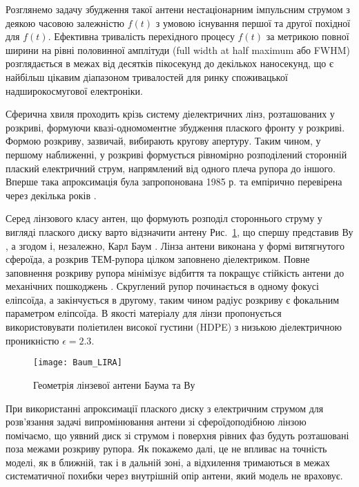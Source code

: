 Розглянемо задачу збудження такої антени нестаціонарним імпульсним струмом
з деякою часовою залежністю $ f(t) $ з умовою існування першої та другої 
похідної для $ f(t) $. Ефективна тривалість перехідного процесу $ f(t) $ за 
метрикою повної ширини на рівні половинної амплітуди (full width at half 
maximum або FWHM) розглядається в межах від десятків пікосекунд до декількох 
наносекунд, що є найбільш цікавим діапазоном тривалостей для ринку 
споживацької надширокосмугової електроніки.

Сферична хвиля проходить крізь систему діелектричних лінз, розташованих у 
розкриві, формуючи квазі-одномоментне збудження плаского фронту у розкриві. 
Формою розкриву, зазвичай, вибирають кругову апертуру. Таким чином, у першому 
наближенні, у розкриві формується рівномірно розподілений сторонній плаский 
електричний струм, напрямлений від одного плеча рупора до іншого. Вперше така
апроксимація була запропонована 1985 р. \cite{imp:Wu1985} та 
емпірично перевірена через декілька років \cite{imp:Wu1991}.

Серед лінзового класу антен, що формують розподіл стороннього струму у 
вигляді плаского диску варто відзначити антену Рис.~\ref{fig:lira_baum}, що 
спершу представив Ву \cite{imp:Wu1987}, а згодом і, незалежно, Карл Баум 
\cite{imp:BaumSSN0377}. Лінза антени виконана у формі витягнутого сфероїда, 
а розкрив ТЕМ-рупора цілком заповнено діелектриком. Повне заповнення 
розкриву рупора мінімізує відбиття та покращує стійкість антени до механічних 
пошкоджень \cite{imp:BaumSSN0377}. Скруглений рупор починається в одному 
фокусі еліпсоїда, а закінчується в другому, таким чином радіус розкриву є 
фокальним параметром еліпсоїда. В якості матеріалу для лінзи пропонується 
використовувати поліетилен високої густини (HDPE) з низькою діелектричною 
проникністю $\epsilon = 2.3 $.

\begin{figure}[htbp] \begin{center}
\texttt{[image: Baum\_LIRA]}
\caption{Геометрія лінзевої антени Баума та Ву} \label{fig:lira_baum}
\end{center} \end{figure}

При використанні апроксимації плаского диску з електричним струмом для 
розв'язання задачі випромінювання антени зі сфероїдоподібною лінзою 
помічаємо, що уявний диск зі струмом і поверхня рівних фаз будуть розташовані 
поза межами розкриву рупора. Як покажемо далі, це не впливає на точність 
моделі, як в ближній, так і в дальній зоні, а відхилення тримаються в межах
систематичної похибки через внутрішній опір антени, який модель не враховує.

